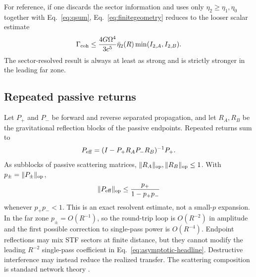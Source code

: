 For reference, if one discards the sector information and uses only $\eta_2\ge\eta_1,\eta_0$ together with Eq.~\eqref{eq:qsum}, Eq.~\eqref{eq:finitegeometry} reduces to the looser scalar estimate
\begin{equation}
\Gamma_{\rm coh}
\le
\frac{4G\Omega^4}{3c^5}\bar\eta_2(R)
\min(I_{2,A},I_{2,B}).
\end{equation}
The sector-resolved result is always at least as strong and is strictly stronger in the leading far zone.

\subsection{Repeated passive returns}

Let $P_+$ and $P_-$ be forward and reverse separated propagation, and let $R_A,R_B$ be the gravitational reflection blocks of the passive endpoints. Repeated returns sum to
\begin{equation}
P_{\rm eff}
=(I-P_+R_AP_-R_B)^{-1}P_+ .
\end{equation}
As subblocks of passive scattering matrices, $\|R_A\|_{\mathrm{op}},\|R_B\|_{\mathrm{op}}\le1$. With $p_\pm=\|P_\pm\|_{\mathrm{op}}$,
\begin{equation}
\|P_{\rm eff}\|_{\mathrm{op}}
\le\frac{p_+}{1-p_+p_-}
\end{equation}
whenever $p_+p_-<1$. This is an exact resolvent estimate, not a small-$p$ expansion. In the far zone $p_\pm=O(R^{-1})$, so the round-trip loop is $O(R^{-2})$ in amplitude and the first possible correction to single-pass power is $O(R^{-4})$. Endpoint reflections may mix STF sectors at finite distance, but they cannot modify the leading $R^{-2}$ single-pass coefficient in Eq.~\eqref{eq:asymptotic-headline}. Destructive interference may instead reduce the realized transfer. The scattering composition is standard network theory \cite{Redheffer1962}.
